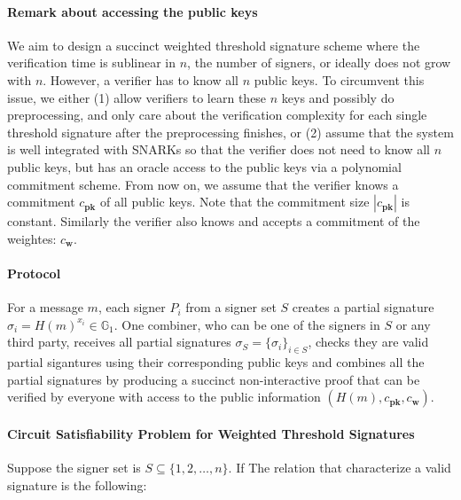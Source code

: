 \paragraph{Remark about accessing the public keys} We aim to design a succinct weighted threshold signature scheme where the verification time is sublinear in $n$, the number of signers, or ideally does not grow with $n$. However, a verifier has to know all $n$ public keys. To circumvent this issue, we either (1) allow verifiers to learn these $n$ keys and possibly do preprocessing, and only care about the verification complexity for each single threshold signature after the preprocessing finishes, or (2) assume that the system is well integrated with SNARKs so that the verifier does not need to know all $n$ public keys, but has an oracle access to the public keys via a polynomial commitment scheme. From now on, we assume that the verifier knows a commitment $c_{\mathbf{pk}}$ of all public keys. Note that the commitment size $|c_{\mathbf{pk}}|$ is constant. Similarly the verifier also knows and accepts a commitment of the weightes: $c_{\mathbf{w}}$. 

\paragraph{Protocol} For a message $m$, each signer $P_i$ from a signer set $S$ creates a partial signature $\sigma_i = H(m)^{x_i}\in \mathbb{G}_1$. One combiner, who can be one of the signers in $S$ or any third party, receives all partial signatures $\sigma_S = \{\sigma_i\}_{i\in S}$, checks they are valid partial sigantures using their corresponding public keys and combines all the partial signatures by producing a succinct non-interactive proof that can be verified by everyone with access to the public information $(H(m), c_{\mathbf{pk}}, c_{\mathbf{w}})$. 

\paragraph{Circuit Satisfiability Problem for Weighted Threshold Signatures} Suppose the signer set is $S\subseteq \{1,2,\dots, n\}$. If  The relation that characterize a valid signature is the following:

